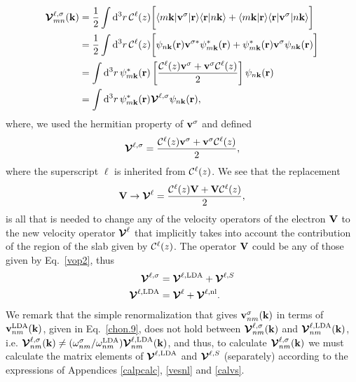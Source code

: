 \documentclass[floatfix,prb,aps,superscriptaddress,11pt,preprint,letterpaper]{revtex4}
\begin{document}
\begin{align}\label{intj}
{\boldsymbol{\mathcal{V}}}^{\ell,\sigma}_{mn}({\mathbf k})
&=
\frac{1}{2}
\int \mathrm{d}^3 r\,
 {\mathbf{\cal C}}^\ell(z)
\bigg[
\langle m\mathbf{k}|\mathbf{v}^\sigma | \mathbf{r}\rangle
\langle \mathbf{r} | n \mathbf k \rangle +
\langle m\mathbf{k} | \mathbf{r}\rangle
\langle \mathbf{r} | \mathbf{v}^\sigma | n \mathbf k \rangle\bigg]
\nonumber\\
&=
\frac{1}{2}
\int \mathrm{d}^3 r\,
 {\mathbf{\cal C}}^\ell(z)
 \bigg[
\psi_{n\mathbf{k}}(\mathbf{r})
\mathbf{v}^{\sigma *}\psi^*_{m\mathbf{k}}(\mathbf{r})
+ 
\psi^*_{m\mathbf{k}}(\mathbf{r})\mathbf{v}^\sigma
\psi_{n\mathbf{k}}(\mathbf{r})
\bigg]
\nonumber\\
&=
\int \mathrm{d}^3 r\,
\psi^*_{m\mathbf{k}}(\mathbf{r})
\left[\frac{{\mathbf{\cal C}}^\ell(z) \mathbf{v}^\sigma +
\mathbf{v}^\sigma {\mathbf{\cal C}}^\ell(z)}{2}\right]
\psi_{n\mathbf{k}}(\mathbf{r})
\nonumber\\
&=
\int \mathrm{d}^3 r\,
\psi^*_{m\mathbf{k}}(\mathbf{r})
\boldsymbol{\mathcal{\cal V}}^{\ell,\sigma}
\psi_{n\mathbf{k}}(\mathbf{r})
,
\end{align}
where, we used the hermitian property of $\mathbf{v}^\sigma$ and defined
\begin{align}\label{nl.4}
\boldsymbol{\mathcal{\cal V}}^{\ell,\sigma}
=
\frac{{\mathbf{\cal C}}^\ell(z) \mathbf{v}^\sigma +
\mathbf{v}^\sigma {\mathbf{\cal C}}^\ell(z)}{2}
,
\end{align} 
where the superscript $\ell$ is inherited from ${\mathbf{\cal C}}^\ell(z)$.
We see that the replacement
\begin{align}\label{vcali}
\mathbf{V} \to \boldsymbol{\mathcal{\cal V}}^{\ell}=\frac{{\mathbf{\cal C}}^\ell(z) \mathbf{V} +
\mathbf{V} {\mathbf{\cal C}}^\ell(z)}{2}
,
\end{align} 
is all that is needed to change any of the
velocity operators of the electron $\mathbf{V}$ to the new velocity
operator $\boldsymbol{\mathcal{\cal V}}^{\ell}$ that implicitly takes into account the
contribution of the region of the slab given by ${\mathbf{\cal C}}^\ell(z)$.
The operator $\mathbf{V}$ could be any of those given by Eq.~\eqref{vop2},
thus
\begin{align}\label{vopii}
\boldsymbol{\mathcal{\cal V}}^{\ell,\sigma}
&=
\boldsymbol{\mathcal{\cal V}}^{\ell,\mathrm{LDA}}
+
\boldsymbol{\mathcal{\cal V}}^{\ell,S}
\nonumber\\
\boldsymbol{\mathcal{\cal V}}^{\ell,\mathrm{LDA}}
&=
\boldsymbol{\mathcal{\cal V}}^{\ell}
+
\boldsymbol{\mathcal{\cal V}}^{\ell,\mathrm{nl}}
.
\end{align}
We remark that the simple renormalization that gives 
$\mathbf{v}^{\sigma}_{nm}(\mathbf{k})$ 
in terms of
$\mathbf{v}^{\mathrm{LDA}}_{nm}(\mathbf{k})$,
given in 
Eq.~\eqref{chon.9}, 
does not hold between
$\boldsymbol{\mathcal{\cal V}}^{\ell,\sigma}_{nm}(\mathbf{k})$   
and 
$\boldsymbol{\mathcal{\cal V}}^{\ell,\mathrm{LDA}}_{nm}(\mathbf{k})$,
i.e.
$\boldsymbol{\mathcal{\cal V}}^{\ell,\sigma}_{nm}(\mathbf{k})\ne
(\omega^\sigma_{nm}/\omega^{\mathrm{LDA}}_{nm})
\boldsymbol{\mathcal{\cal V}}^{\ell,\mathrm{LDA}}_{nm}(\mathbf{k})$,
and thus, to calculate
$\boldsymbol{\mathcal{\cal V}}^{\ell,\sigma}_{nm}(\mathbf{k})$ 
we must calculate the matrix elements of 
$\boldsymbol{\mathcal{\cal V}}^{\ell,\mathrm{LDA}}$ and $\boldsymbol{\mathcal{\cal V}}^{\ell,S}$
 (separately)
according to the expressions of
Appendices \ref{calpcalc}, \ref{vesnl} and \ref{calvs}.
\end{document}
